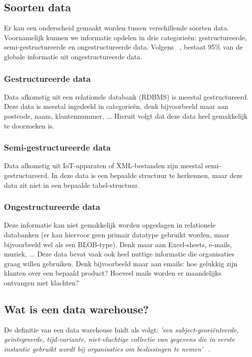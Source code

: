 \subsection{Soorten data}
Er kan een onderscheid gemaakt worden tussen verschillende soorten data. Voornamelijk kunnen we informatie opdelen in drie categorieën: gestructureerde, semi-gestructureerde en ongestructureerde data. Volgens  ~\textcite{Langseth2005}, bestaat 95\% van de globale informatie uit ongestructureerde data. 

\subsubsection{Gestructureerde data}
Data afkomstig uit een relationele databank (RDBMS) is meestal gestructureerd. Deze data is meestal ingedeeld in categorieën, denk bijvoorbeeld maar aan postcode, naam, klantennummer, ... Hieruit volgt dat deze data heel gemakkelijk te doorzoeken is. 

\subsubsection{Semi-gestructureerde data}
Data afkomstig uit IoT-apparaten of XML-bestanden zijn meestal semi-gestructureerd. In deze data is een bepaalde structuur te herkennen, maar deze data zit niet in een bepaalde tabel-structuur.

\subsubsection{Ongestructureerde data}
Deze informatie kan niet gemakkelijk worden opgeslagen in relationele databanken (er kan hiervoor geen primair datatype gebruikt worden, maar bijvoorbeeld wel als een BLOB-type). Denk maar aan Excel-sheets, e-mails, muziek, ... Deze data bevat vaak ook heel nuttige informatie die organisaties graag willen gebruiken. Denk bijvoorbeeld maar aan emails: hoe gelukkig zijn klanten over een bepaald product? Hoeveel mails worden er maandelijks ontvangen met klachten?

\subsection{Wat is een data warehouse?}
De definitie van een data warehouse luidt als volgt: \textit{'een subject-georiënteerde, geïntegreerde, tijd-variante, niet-vluchtige collectie van gegevens die in eerste instantie gebruikt wordt bij organisaties om beslissingen te nemen'} ~\autocite{Inmon2005}.

